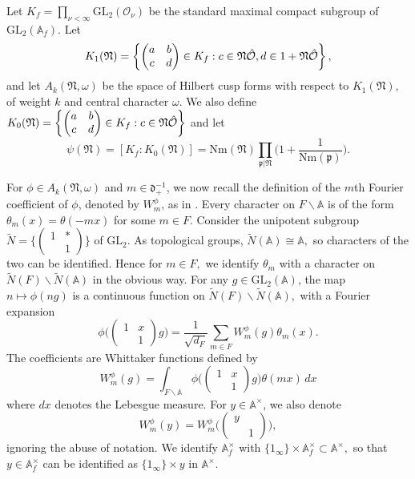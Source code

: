 \documentclass[reqno]{amsart}
\theoremstyle{plain}
\theoremstyle{definition}
\theoremstyle{remark}
\def\GL{\mathrm{GL}}
\def\Nr{\mathrm{Nm}}
\def\A{\mathbbm A}
\def\A{\mathbb A}
\begin{document}
Let $K_{f}=\prod_{\nu<\infty} \GL_2(\mathcal{O}_\nu)$ be the standard maximal compact subgroup of $\GL_2 (\A_{f}) .$
Let 
\begin{equation}\label{K_1-def}
K_1(\mathfrak{N})=  \left\{ \begin{pmatrix} a & b\\  c & d \end{pmatrix} \in K_{f}  : c \in \mathfrak{N} \Hat{\mathcal{O}}, d\in 1+ \mathfrak{N}\Hat{\mathcal{O}} \right\},
\end{equation} and let   $A_k(\mathfrak{N},\omega) $ be the  space  of Hilbert cusp forms with respect to  $K_1(\mathfrak{N})$, of weight $k$ and central character $\omega$. We also define $K_0(\mathfrak{N})=  \left\{ \begin{pmatrix} a & b\\  c & d \end{pmatrix} \in K_{f}  : c \in \mathfrak{N}\Hat{\mathcal{O}}  \right\}$ and let $$\psi(\mathfrak{N})=[K_{f} : K_0(\mathfrak{N})]=\Nr(\mathfrak{N})\prod_{\mathfrak{p}|\mathfrak{N}}\Big(1+\frac{1}{\Nr(\mathfrak{p})}\Big).$$


For $\phi \in A_k(\mathfrak{N},\omega)$ and $m\in \mathfrak{d}^{-1}_+$, we now recall the definition of the $m$th Fourier coefficient of $\phi$, denoted by  $W_m^\phi$, as in \cite[\S 3.4]{KL}. Every character on $F\backslash\A$ is of the form $\theta_m(x)=\theta(-mx)$ for some $m\in F.$
Consider the unipotent subgroup $\tilde{N}=\bigg\{\begin{pmatrix}
1 & * \\
 & 1 
\end{pmatrix}\bigg\}$   of $\GL_2$. As topological groups, $\tilde{N}(\A)\cong \A,$ so characters of the two can be identified. Hence for $m\in F,$ we identify $\theta_m$ with  a character on $\tilde{N}(F)\backslash \tilde{N}(\A)$ in the obvious way. For any $g\in\GL_2(\A)$, the map $n\mapsto \phi(ng)$ is a continuous function on $\tilde{N}(F)\backslash \tilde{N}(\A),$ with a Fourier expansion
$$
\phi\bigg(\begin{pmatrix}
1 & x \\
 & 1 
\end{pmatrix}g \bigg)=\frac{1}{\sqrt{d_F}}\sum_{m\in F} W_m^\phi(g) \theta_m(x).
$$  
The coefficients are Whittaker functions defined by 
\begin{equation}\label{eqn: Fourier-coefficient}
W_m^\phi(g)=\int_{F\backslash\A}     \phi\bigg(\begin{pmatrix}
1 & x \\
 & 1 
\end{pmatrix}g \bigg) \theta(mx) \, dx     
\end{equation}
where $dx$ denotes the Lebesgue measure. 
For $y\in  \A^\times$, we also denote 
$$
W^\phi_m(y)=W^\phi_m\bigg(\begin{pmatrix}
y &  \\
 & 1 
\end{pmatrix}\bigg),
$$ 
ignoring the abuse of notation. We identify $\A_f^\times  $ with $\{1_\infty \}\times \A_f^\times \subset \A^\times,$ so that  $y\in  \A_f^\times$ can be identified as $\{1_\infty\}\times y$ in $\A^\times$.
\end{document}

